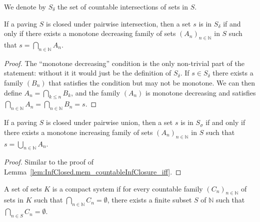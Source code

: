 \begin{definition}\label{def:countableInfClosure}
  \mathlibok
We denote by $S_\delta$ the set of countable intersections of sets in $S$.
\end{definition}


\begin{lemma}\label{lem:InfClosed.mem_countableInfClosure_iff}
  \leanok
If a paving $S$ is closed under pairwise intersection, then a set $s$ is in $S_\delta$ if and only if there exists a monotone decreasing family of sets $(A_n)_{n\in\mathbb{N}}$ in $S$ such that $s = \bigcap_{n\in\mathbb{N}} A_n$.
\end{lemma}

\begin{proof}\leanok
The ``monotone decreasing'' condition is the only non-trivial part of the statement: without it it would just be the definition of $S_\delta$.
If $s \in S_\delta$ there exists a family $(B_n)$ that satisfies the condition but may not be monotone. We can then define $A_n = \bigcap_{k \le n} B_k$, and the family $(A_n)$ is monotone decreasing and satisfies $\bigcap_{n\in\mathbb{N}} A_n = \bigcap_{n\in\mathbb{N}} B_n = s$.
\end{proof}


\begin{lemma}\label{lem:SupClosed.mem_countableSupClosure_iff}
  \leanok
If a paving $S$ is closed under pairwise union, then a set $s$ is in $S_\sigma$ if and only if there exists a monotone increasing family of sets $(A_n)_{n\in\mathbb{N}}$ in $S$ such that $s = \bigcup_{n\in\mathbb{N}} A_n$.
\end{lemma}

\begin{proof}\leanok
Similar to the proof of Lemma~\ref{lem:InfClosed.mem_countableInfClosure_iff}.
\end{proof}


\begin{definition}\label{def:IsCompactSystem}
  \mathlibok
A set of sets $K$ is a compact system if for every countable family $(C_n)_{n \in \mathbb{N}}$ of sets in $K$ such that $\bigcap_{n \in\mathbb{N}} C_n = \emptyset$, there exists a finite subset $S$ of $\mathbb{N}$ such that $\bigcap_{n \in S} C_n = \emptyset$.
\end{definition}


